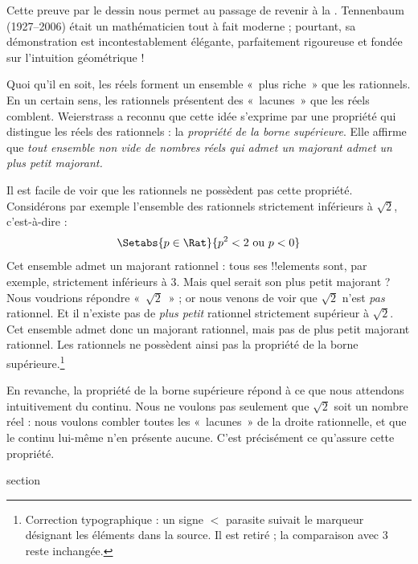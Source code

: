 \documentclass[11pt,a4paper,openany]{memoir}
\begin{document}
Cette preuve par le dessin nous permet au passage de revenir à la
. Tennenbaum (1927--2006) était un
mathématicien tout à fait moderne ; pourtant, sa démonstration est
incontestablement élégante, parfaitement rigoureuse et fondée sur
l'intuition géométrique !{}

Quoi qu'il en soit, les réels forment un ensemble «~plus riche~» que les
rationnels. En un certain sens, les rationnels présentent des «~lacunes~»
que les réels comblent. Weierstrass a reconnu que cette idée s'exprime
par une propriété qui distingue les réels des rationnels : la
\emph{propriété de la borne supérieure}. Elle affirme que
\emph{tout ensemble non vide de nombres réels qui admet un majorant
admet un plus petit majorant.}

Il est facile de voir que les rationnels ne possèdent pas cette
propriété. Considérons par exemple l'ensemble des rationnels
strictement inférieurs à $\sqrt{2}$, c'est-à-dire :
\[
	\Setabs{p \in \Rat}{p^2 < 2 \text{ ou }p < 0}
\]
Cet ensemble admet un majorant rationnel : tous ses !!{element}s sont,
par exemple, strictement inférieurs à $3$. Mais quel serait son plus
petit majorant ? Nous voudrions répondre «~$\sqrt{2}$~» ; or nous venons
de voir que $\sqrt{2}$ n'est \emph{pas} rationnel. Et il n'existe pas
de \emph{plus petit} rationnel strictement supérieur à $\sqrt{2}$.
Cet ensemble admet donc un majorant rationnel, mais pas de plus petit
majorant rationnel. Les rationnels ne possèdent ainsi pas la propriété
de la borne supérieure.\footnote{Correction typographique : un signe $<$ parasite suivait le marqueur désignant les éléments dans la source. Il est retiré ; la comparaison avec $3$ reste inchangée.}

En revanche, la propriété de la borne supérieure répond à ce que nous
attendons intuitivement du continu. Nous ne voulons pas seulement que
$\sqrt{2}$ soit un nombre réel : nous voulons combler toutes les
«~lacunes~» de la droite rationnelle, et que le continu lui-même n'en
présente aucune. C'est précisément ce qu'assure cette propriété.


\endgroup


\begingroup
\expandafter\def\csname ol@sectioncs\endcsname{section}
\def\olfilename{cuts}


\end{document}
